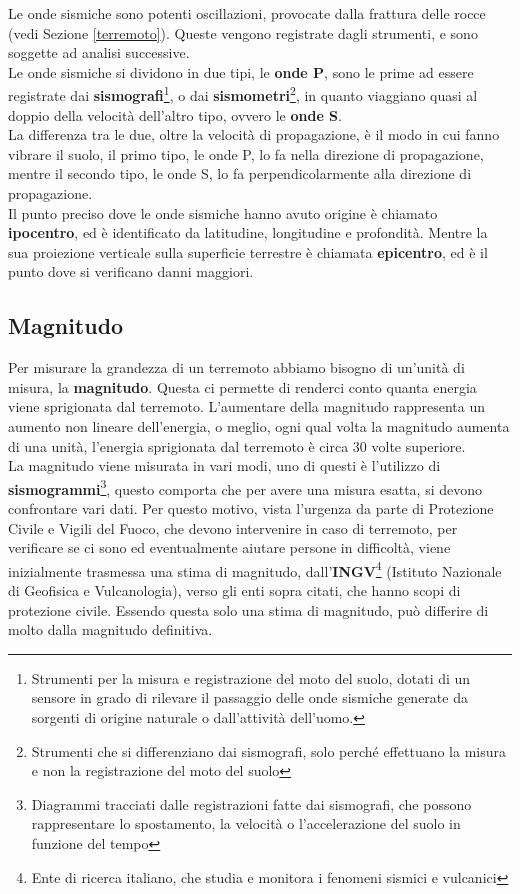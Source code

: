 Le onde sismiche sono potenti oscillazioni, provocate dalla frattura delle rocce (vedi Sezione \ref{terremoto}). Queste vengono registrate dagli strumenti, e sono soggette ad analisi successive.\\
Le onde sismiche si dividono in due tipi, le \textbf{onde P}, sono le prime ad essere registrate dai \textbf{sismografi}\footnote{Strumenti per la misura e registrazione del moto del suolo, dotati di un sensore in grado di rilevare il passaggio delle onde sismiche generate da sorgenti di origine naturale o dall'attivit\`a dell'uomo.}, o dai \textbf{sismometri}\footnote{Strumenti che si differenziano dai sismografi, solo perch\'e effettuano la misura e non la registrazione del moto del suolo}, in quanto viaggiano quasi al doppio della velocit\`a dell'altro tipo, ovvero le \textbf{onde S}.\\
La differenza tra le due, oltre la velocit\`a di propagazione, \`e il modo in cui fanno vibrare il suolo, il primo tipo, le onde P, lo fa nella direzione di propagazione, mentre il secondo tipo, le onde S, lo fa perpendicolarmente alla direzione di propagazione.\\
Il punto preciso dove le onde sismiche hanno avuto origine \`e chiamato \textbf{ipocentro}, ed \`e identificato da latitudine, longitudine e profondit\`a. Mentre la sua proiezione verticale sulla superficie terrestre \`e chiamata \textbf{epicentro}, ed \`e il punto dove si verificano danni maggiori.\\

\subsection{Magnitudo}

Per misurare la grandezza di un terremoto abbiamo bisogno di un'unit\`a di misura, la \textbf{magnitudo}. Questa ci permette di renderci conto quanta energia viene sprigionata dal terremoto. L'aumentare della magnitudo rappresenta un aumento non lineare dell'energia, o meglio, ogni qual volta la magnitudo aumenta di una unit\`a, l'energia sprigionata dal terremoto \`e circa 30 volte superiore.\\
La magnitudo viene misurata in vari modi, uno di questi \`e l'utilizzo di \textbf{sismogrammi}\footnote{Diagrammi tracciati dalle registrazioni fatte dai sismografi, che possono rappresentare lo spostamento, la velocit\`a o l'accelerazione del suolo in funzione del tempo}, questo comporta che per avere una misura esatta, si devono confrontare vari dati. Per questo motivo, vista l'urgenza da parte di Protezione Civile e Vigili del Fuoco, che devono intervenire in caso di terremoto, per verificare se ci sono ed eventualmente aiutare persone in difficolt\`a, viene inizialmente trasmessa una stima di magnitudo, dall'\textbf{INGV}\footnote{Ente di ricerca italiano, che studia e monitora i fenomeni sismici e vulcanici} (Istituto Nazionale di Geofisica e Vulcanologia), verso gli enti sopra citati, che hanno scopi di protezione civile. Essendo questa solo una stima di magnitudo, pu\`o differire di molto dalla magnitudo definitiva.

